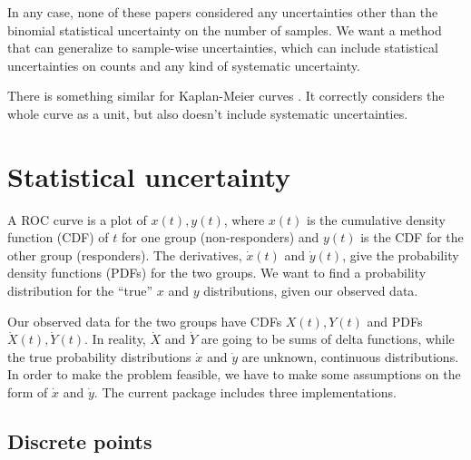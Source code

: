 \documentclass[11pt]{article}
\newcommand{\xdot}{\dot{x}}
\newcommand{\ydot}{\dot{y}}
\newcommand{\Xdot}{\dot{X}}
\newcommand{\Ydot}{\dot{Y}}
\begin{document}
In any case, none of these papers considered any uncertainties other than the binomial statistical uncertainty on the number of samples.  We want a method that can generalize to sample-wise uncertainties, which can include statistical uncertainties on counts and any kind of systematic uncertainty.

There is something similar for Kaplan-Meier curves \autocite{kaplanmeier_sachs}.  It correctly considers the whole curve as a unit, but also doesn't include systematic uncertainties.

\section{Statistical uncertainty}
\label{sec:stat}

A ROC curve is a plot of \(x(t), y(t)\), where \(x(t)\) is the cumulative density function (CDF) of \(t\) for one group (non-responders) and \(y(t)\) is the CDF for the other group (responders).  The derivatives, \(\xdot(t)\) and \(\ydot(t)\), give the probability density functions (PDFs) for the two groups.   We want to find a probability distribution for the ``true'' \(x\) and \(y\) distributions, given our observed data.

Our observed data for the two groups have CDFs \(X(t), Y(t)\) and PDFs \(\Xdot(t), \Ydot(t)\).  In reality, \(\Xdot\) and \(\Ydot\) are going to be sums of delta functions, while the true probability distributions \(\xdot\) and \(\ydot\) are unknown, continuous distributions.  In order to make the problem feasible, we have to make some assumptions on the form of \(\xdot\) and \(\ydot\).  The current package includes three implementations.

\subsection{Discrete points}
\label{sec:discrete}
\end{document}

